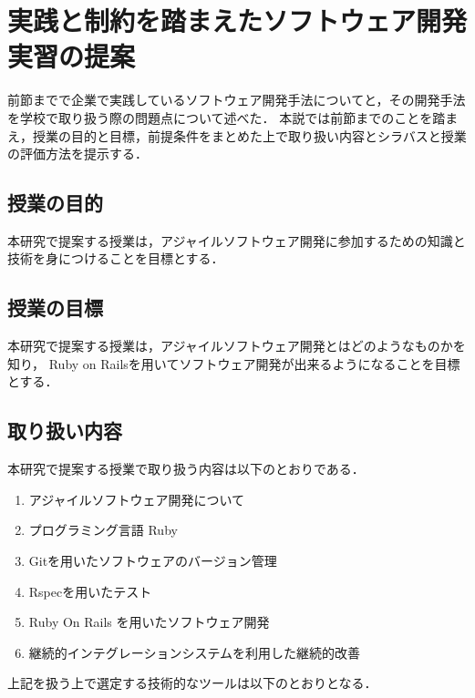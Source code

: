 \section{実践と制約を踏まえたソフトウェア開発実習の提案}

前節までで企業で実践しているソフトウェア開発手法についてと，その開発手法を学校で取り扱う際の問題点について述べた．
本説では前節までのことを踏まえ，授業の目的と目標，前提条件をまとめた上で取り扱い内容とシラバスと授業の評価方法を提示する．

\subsection{授業の目的}

本研究で提案する授業は，アジャイルソフトウェア開発に参加するための知識と技術を身につけることを目標とする．

\subsection{授業の目標}

本研究で提案する授業は，アジャイルソフトウェア開発とはどのようなものかを知り， Ruby on Railsを用いてソフトウェア開発が出来るようになることを目標とする．

\subsection{取り扱い内容
  \label{tech-content}
}

本研究で提案する授業で取り扱う内容は以下のとおりである．

\begin{enumerate}
  \item アジャイルソフトウェア開発について
  \item プログラミング言語 Ruby
  \item Gitを用いたソフトウェアのバージョン管理
  \item Rspecを用いたテスト
  \item Ruby On Rails を用いたソフトウェア開発
  \item 継続的インテグレーションシステムを利用した継続的改善
\end{enumerate}

上記を扱う上で選定する技術的なツールは以下のとおりとなる．

